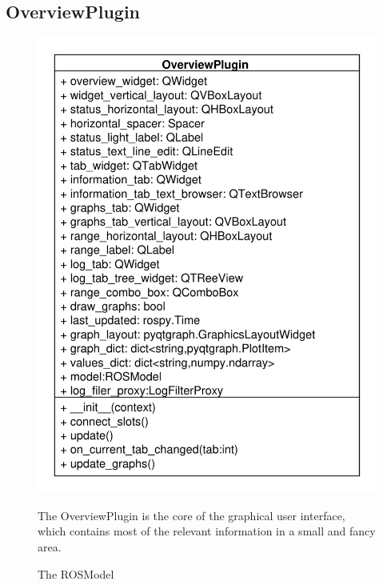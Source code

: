 \subsection{OverviewPlugin}
\begin{figure}[htbp]
	\begin{minipage}[t]{7cm}
		\vspace{0pt}
		\centering
		\includegraphics[scale=0.6]{./diagram_pictures/Overview.pdf}
		\caption{The ROSModel}
	\end{minipage}
	\hfill
	\begin{minipage}[t]{6.5cm}
		\vspace{10pt}
		The OverviewPlugin is the core of the graphical user interface, which
		contains most of the relevant information in a small and fancy area.
	\end{minipage}
\end{figure} 
